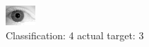 \begin{figure}[h!]
\begin{center}
\includegraphics[width=0.60\columnwidth]{figures/ID2134_class_4_target_3.png}
\end{center}
\caption{ Classification: 4 actual target: 3}
\label{fig:ID2134_class_4_target_3}
\end{figure}
